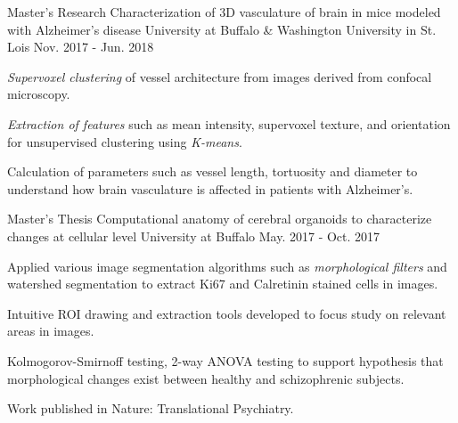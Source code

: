 

\begin{cventries}
    \cventry
    {Master's Research} %
    {Characterization of 3D vasculature of brain in mice modeled with Alzheimer's disease} %
    {University at Buffalo \& Washington University in St. Lois} %
    {Nov. 2017 - Jun. 2018} %
    {
      \begin{cvitems} %
        \item {\emph{Supervoxel clustering} of vessel architecture from images derived from confocal microscopy.}
        \item {\emph{Extraction of features} such as mean intensity, supervoxel texture, and orientation for unsupervised clustering using \emph{K-means}.}
        \item{Calculation of parameters such as vessel length, tortuosity and diameter to understand how brain vasculature is affected in patients with Alzheimer's.}
      \end{cvitems}
    }
    
    \cventry
    {Master's Thesis} %
    {Computational anatomy of cerebral organoids to characterize changes at cellular level} %
    {University at Buffalo} %
    {May. 2017 - Oct. 2017} %
    {
      \begin{cvitems} %
        \item {Applied various image segmentation algorithms such as \emph{morphological filters} and watershed segmentation to extract Ki67 and Calretinin stained cells in images.}
        \item{Intuitive ROI drawing and extraction tools developed to focus study on relevant areas in images.}
        \item{Kolmogorov-Smirnoff testing, 2-way ANOVA testing to support hypothesis that morphological changes exist between healthy and schizophrenic subjects.}
        \item{Work published in Nature: Translational Psychiatry.}
      \end{cvitems}
    }
    

\end{cventries}
